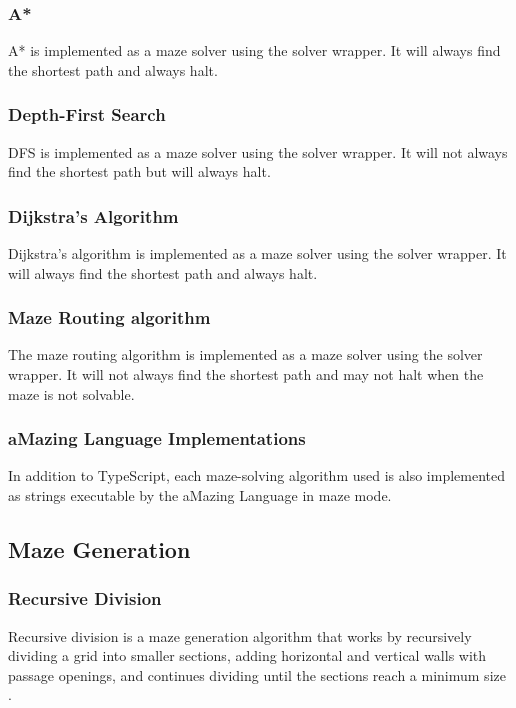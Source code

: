 \subsubsection{A*}

A* \cite{a-star-alg} is implemented as a maze solver using the solver wrapper. It will always find the shortest path and always halt.

\subsubsection{Depth-First Search}

DFS \cite{pkd} is implemented as a maze solver using the solver wrapper. It will not always find the shortest path but will always halt.

\subsubsection{Dijkstra's Algorithm}

Dijkstra's algorithm \cite{dijkstras-alg} is implemented as a maze solver using the solver wrapper. It will always find the shortest path and always halt.

\subsubsection{Maze Routing algorithm}

The maze routing algorithm \cite{maze-routing-alg} is implemented as a maze solver using the solver wrapper. It will not always find the shortest path and may not halt when the maze is not solvable.

\subsubsection{aMazing Language Implementations}

In addition to TypeScript, each maze-solving algorithm used is also implemented as strings executable by the aMazing Language in maze mode.

\subsection{Maze Generation}
\subsubsection{Recursive Division}
Recursive division is a maze generation algorithm that works by recursively dividing a grid into smaller sections, adding horizontal and vertical walls with passage openings, and continues dividing until the sections reach a minimum size \cite{recursive-division-alg}.

